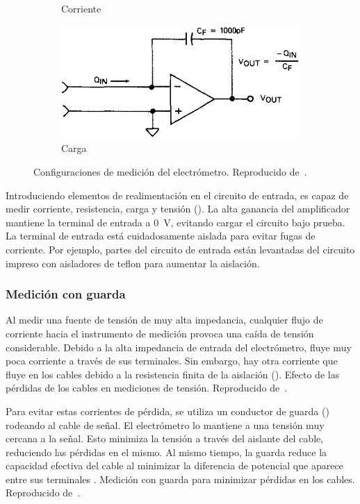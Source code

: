 \begin{figure}[p]
\begin{subfigure}[b]{\textwidth}
        \caption{Corriente}
    \end{subfigure}
    \begin{subfigure}[b]{\textwidth}
    \centering
        \includegraphics{figuras/instrumental/617coulombs.png}
        \caption{Carga}
    \end{subfigure}
    \caption{Configuraciones de medición del electrómetro.
    Reproducido de~\cite{keithley_instruments_inc._keithley_1984}.}
    \label{fig:keithley617}
\end{figure}
Introduciendo elementos de realimentación en el circuito de entrada,
es capaz de medir corriente, resistencia, carga y tensión
().
La alta ganancia del amplificador mantiene la terminal de entrada a
\SI{0}{\volt}, 
evitando cargar el circuito bajo prueba.
La terminal de entrada está cuidadosamente aislada 
para evitar fugas de corriente. 
Por ejemplo, partes del circuito de entrada 
están levantadas del circuito impreso con aisladores de teflon
para aumentar la aislación.
\subsubsection{Medición con guarda}
Al medir una fuente de tensión de muy alta impedancia,
cualquier flujo de corriente hacia el instrumento de medición
provoca una caída de tensión considerable.
Debido a la alta impedancia de entrada del electrómetro,
fluye muy poca corriente a través de sus terminales.
Sin embargo, hay otra corriente que fluye en los cables debido a la resistencia
finita de la aislación ().
{Efecto de las pérdidas de los cables en mediciones de tensión.
    Reproducido de~\cite{keithley_instruments_inc._keithley_1984}.}

Para evitar estas corrientes de pérdida,
se utiliza un conductor de guarda ()
rodeando al cable de señal.
El electrómetro lo mantiene a una tensión muy cercana a la señal.
Esto minimiza la tensión a través del aislante del cable,
reduciendo las pérdidas en el mismo.
Al mismo tiempo, la guarda reduce la capacidad efectiva del cable
al minimizar la diferencia de potencial que aparece entre sus terminales
\cite{rich_shielding_1983}.
{Medición con guarda para minimizar pérdidas en los cables.
    Reproducido de~\cite{keithley_instruments_inc._keithley_1984}.}
